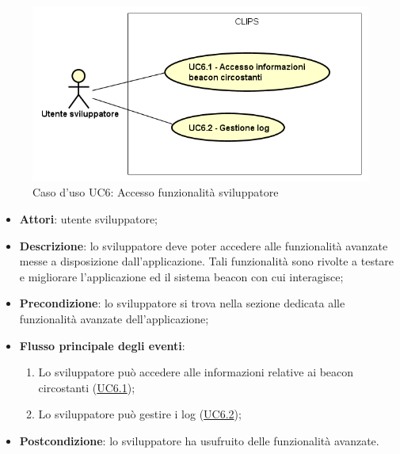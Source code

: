 \documentclass[../AnalisiDeiRequisiti.tex]{subfiles}
\begin{document}
        \begin{figure}[!h]
            \centering
            \includegraphics[scale=0.95, width=\textwidth]{img/UC6.png}
            \caption{Caso d'uso UC6: Accesso funzionalità sviluppatore}\label{fig:UC6} 
        \end{figure}
\begin{itemize}
\item \textbf{Attori}: utente sviluppatore;
\item \textbf{Descrizione}: lo sviluppatore deve poter accedere alle funzionalità avanzate messe a disposizione dall'applicazione. Tali funzionalità sono rivolte a testare e migliorare l'applicazione ed il sistema beacon con cui interagisce; 
      \item \textbf{Precondizione}: lo sviluppatore si trova nella sezione dedicata alle funzionalità avanzate dell'applicazione;

        \item \textbf{Flusso principale degli eventi}:
          \begin{enumerate}
          \item Lo sviluppatore può accedere alle informazioni relative ai beacon circostanti (\hyperlink{UC6.1}{UC6.1});
          \item Lo sviluppatore può gestire i log (\hyperlink{UC6.2}{UC6.2});

      \end{enumerate}
    \item \textbf{Postcondizione}: lo sviluppatore ha usufruito delle funzionalità avanzate.
  \end{itemize}
\hypertarget{UC6.1}{}
\end{document}

